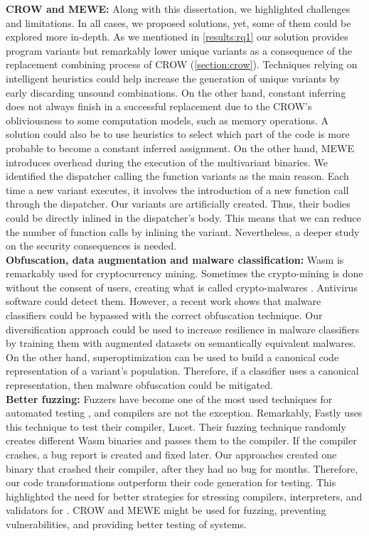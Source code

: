 \textbf{CROW and MEWE:} Along with this dissertation, we highlighted challenges and limitations. In all cases, we proposed solutions, yet, some of them could be explored more in-depth.
As we mentioned in \autoref{results:rq1} our solution provides program variants but remarkably lower unique variants as a consequence of the replacement combining process of CROW (\autoref{section:crow}). 
Techniques relying on intelligent heuristics could help increase the generation of unique variants by early discarding unsound combinations.
On the other hand, constant inferring does not always finish in a successful replacement due to the CROW's obliviousness to some computation models, such as memory operations. 
A solution could also be to use heuristics to select which part of the code is more probable to become a constant inferred assignment.
On the other hand, MEWE introduces overhead during the execution of the multivariant binaries.
We identified the dispatcher calling the function variants as the main reason.
Each time a new variant executes, it involves the introduction of a new function call through the dispatcher.
Our variants are artificially created. Thus, their bodies could be directly inlined in the dispatcher's body.
This means that we can reduce the number of function calls by inlining the variant.
Nevertheless, a deeper study on the security consequences is needed.
\\

\textbf{Obfuscation, data augmentation and malware classification:}
Wasm is remarkably used for cryptocurrency mining. 
Sometimes the crypto-mining is done without the consent of users, creating what is called crypto-malwares \cite{Hilbig2021AnES}.
Antivirus software could detect them. 
However, a recent work \cite{10.1145/3507657.3528560} shows that malware classifiers could be bypassed with the correct obfuscation technique.
Our diversification approach could be used to increase resilience in malware classifiers by training them with augmented datasets on semantically equivalent malwares.
On the other hand, superoptimization can be used to build a canonical code representation of a variant's population.
Therefore, if a classifier uses a canonical representation, then malware obfuscation could be mitigated.
\\

\textbf{Better fuzzing:}
Fuzzers have become one of the most used techniques for automated testing \cite{zalewski2017american}, and compilers are not the exception.
Remarkably, Fastly uses this technique to test their compiler, Lucet.
Their fuzzing technique randomly creates different Wasm binaries and passes them to the compiler. If the compiler crashes, a bug report is created and fixed later.
Our approaches created one binary that crashed their compiler\cite{CVE}, after they had no bug for months.
Therefore, our code transformations outperform their code generation for testing. 
This highlighted the need for better strategies for stressing compilers, interpreters, and validators for \wasm.
CROW and MEWE might be used for fuzzing, preventing vulnerabilities, and providing better testing of systems.


